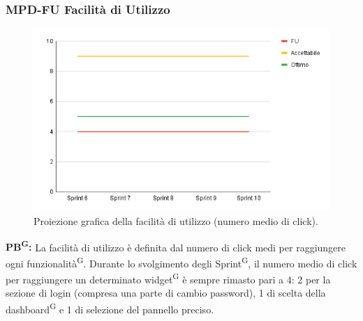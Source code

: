 \documentclass[8pt]{article}
\newcommand{\glossterm}[1]{#1\textsuperscript{G}} %
\begin{document}
\subsubsection{MPD-FU Facilità di Utilizzo}
\begin{figure}[h!]
    \centering
    \includegraphics[width=1\textwidth]{images_pdq/FU.png}
    \caption{Proiezione grafica della facilità di utilizzo (numero medio di click).}
    \label{fig:Proiezione grafica della facilità di utilizzo (numero medio di click)}
\end{figure}
\textbf{\glossterm{PB}:} La facilità di utilizzo è definita dal numero di click medi per raggiungere ogni \glossterm{funzionalità}. Durante lo svolgimento degli \glossterm{Sprint}, il numero medio di click per raggiungere un determinato \glossterm{widget} è sempre rimasto pari a 4: 2 per la sezione di login (compresa una parte di cambio password), 1 di scelta della \glossterm{dashboard} e 1 di selezione del pannello preciso.
\clearpage
\end{document}
